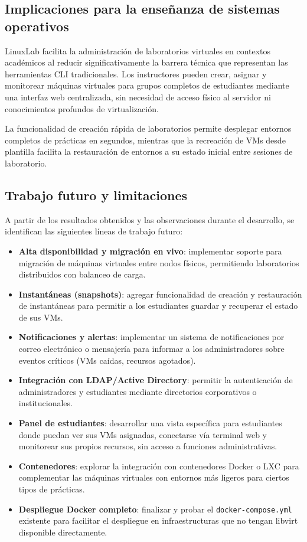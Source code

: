 \subsection{Implicaciones para la enseñanza de sistemas operativos}

LinuxLab facilita la administración de laboratorios virtuales en contextos
académicos al reducir significativamente la barrera técnica que representan las
herramientas CLI tradicionales. Los instructores pueden crear, asignar y
monitorear máquinas virtuales para grupos completos de estudiantes mediante una
interfaz web centralizada, sin necesidad de acceso físico al servidor ni
conocimientos profundos de virtualización.

La funcionalidad de creación rápida de laboratorios permite desplegar entornos
completos de prácticas en segundos, mientras que la recreación de VMs desde
plantilla facilita la restauración de entornos a su estado inicial entre
sesiones de laboratorio.

\subsection{Trabajo futuro y limitaciones}

A partir de los resultados obtenidos y las observaciones durante el desarrollo,
se identifican las siguientes líneas de trabajo futuro:

\begin{itemize}
    \item \textbf{Alta disponibilidad y migración en vivo}: implementar soporte
    para migración de máquinas virtuales entre nodos físicos, permitiendo
    laboratorios distribuidos con balanceo de carga.
    \item \textbf{Instantáneas (snapshots)}: agregar funcionalidad de creación y
    restauración de instantáneas para permitir a los estudiantes guardar y
    recuperar el estado de sus VMs.
    \item \textbf{Notificaciones y alertas}: implementar un sistema de
    notificaciones por correo electrónico o mensajería para informar a los
    administradores sobre eventos críticos (VMs caídas, recursos agotados).
    \item \textbf{Integración con LDAP/Active Directory}: permitir la
    autenticación de administradores y estudiantes mediante directorios
    corporativos o institucionales.
    \item \textbf{Panel de estudiantes}: desarrollar una vista específica para
    estudiantes donde puedan ver sus VMs asignadas, conectarse vía terminal web
    y monitorear sus propios recursos, sin acceso a funciones administrativas.
    \item \textbf{Contenedores}: explorar la integración con contenedores Docker
    o LXC para complementar las máquinas virtuales con entornos más ligeros
    para ciertos tipos de prácticas.
    \item \textbf{Despliegue Docker completo}: finalizar y probar el
    \texttt{docker-compose.yml} existente para facilitar el despliegue en
    infraestructuras que no tengan libvirt disponible directamente.
\end{itemize}

